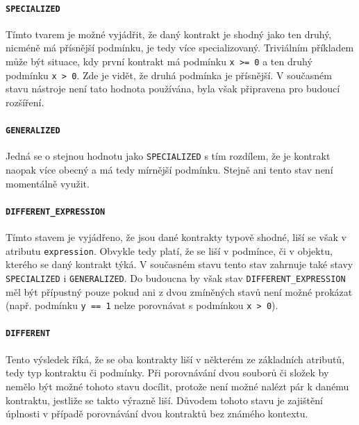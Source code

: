 						\paragraph{\texttt{SPECIALIZED}}
							Tímto tvarem je možné vyjádřit, že daný kontrakt je shodný jako ten druhý, nicméně má přísnější podmínku, je tedy více specializovaný. Triviálním příkladem může být situace, kdy první kontrakt má podmínku \texttt{x >= 0} a ten druhý podmínku \texttt{x > 0}. Zde je vidět, že druhá podmínka je přísnější. V současném stavu nástroje není tato hodnota používána, byla však připravena pro budoucí rozšíření.
							
						\paragraph{\texttt{GENERALIZED}}
							Jedná se o stejnou hodnotu jako \texttt{SPECIALIZED} s tím rozdílem, že je kontrakt naopak více obecný a má tedy mírnější podmínku. Stejně ani tento stav není momentálně využit.
							
						\paragraph{\texttt{DIFFERENT\_EXPRESSION}}
							Tímto stavem je vyjádřeno, že jsou dané kontrakty typově shodné, liší se však v atributu \texttt{expression}. Obvykle tedy platí, že se liší v podmínce, či v objektu, kterého se daný kontrakt týká. V současném stavu tento stav zahrnuje také stavy \texttt{SPECIALIZED} i \texttt{GENERALIZED}. Do budoucna by však stav \texttt{DIFFERENT\_EXPRESSION} měl být přípustný pouze pokud ani z dvou zmíněných stavů není možné prokázat (např. podmínku \texttt{y~== 1} nelze porovnávat s podmínkou \texttt{x > 0}).
							
						\paragraph{\texttt{DIFFERENT}}
							Tento výsledek říká, že se oba kontrakty liší v některém ze základních atributů, tedy typ kontraktu či podmínky. Při porovnávání dvou souborů či složek by nemělo být možné tohoto stavu docílit, protože není možné nalézt pár k danému kontraktu, jestliže se takto výrazně liší. Důvodem tohoto stavu je zajištění úplnosti v případě porovnávání dvou kontraktů bez známého kontextu. 						 
							
